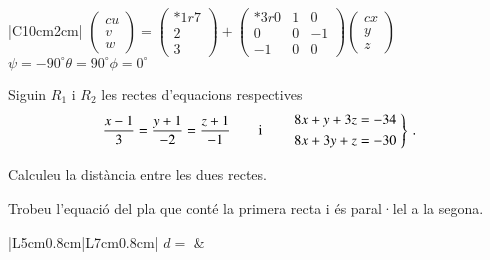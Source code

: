 \documentclass[10pt,catalan]{article}
\begin{document}
\begin{solucio}
\begin{center}
\begin{tabular}{|C{10cm}{2cm}|}
\hline
$\begin{pmatrix}{c} u \\ v \\ w\end{pmatrix} = 
\begin{pmatrix}{*{1}r} 7\\ 2\\ 3\end{pmatrix} + 
\begin{pmatrix}{*{3}r} 0 & 1 & 0\\ 0 & 0 & -1\\ -1 & 0 & 0\end{pmatrix}
\begin{pmatrix}{c} x \\ y \\ z\end{pmatrix}$ \\
\hline
{}
{$\psi=-90^\circ$\hspace{1.7cm}$\theta=90^\circ$\hspace{1.7cm}$\phi=0^\circ$} \\
\hline
\end{tabular}
\end{center}
\end{solucio}





\begin{enunciat}
Siguin $R_1$ i $R_2$ les rectes d'equacions respectives
\[
  \frac{x - 1}{3} = \frac{y + 1}{-2} = \frac{z + 1}{-1}\qquad\text{i}\qquad \left.\aligned 8 x + y + 3 z &= -34 \\ 8 x + 3 y + z &= -30 \endaligned\;\right\}\,.
\]
\begin{apartats}
\item Calculeu la distància entre les dues rectes.
\item Trobeu l'equació del pla que conté la primera recta i és paral·lel a la segona. 
\end{apartats}
\end{enunciat}

\begin{quadricula}
\begin{tabular}{|L{5cm}{0.8cm}|L{7cm}{0.8cm}|}
\hline
$d=$ & \\ 
\hline
\end{tabular}
\end{quadricula}
\end{document}
